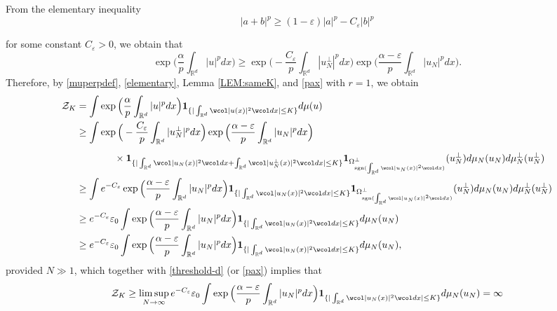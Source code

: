 \documentclass[%
11pt,  reqno]{amsart}
\theoremstyle{remarkstyle}
\newcommand{\1}{\hspace{0.2mm}\text{I}\hspace{0.2mm}}
\newcommand{\noi}{\noindent}
\newcommand{\R}{\mathbb{R}}
\newcommand{\al}{\alpha}
\newcommand{\eps}{\varepsilon}
\newcommand{\wick}[1]{\wcol#1\wcol}
\renewcommand{\O}{\Omega}
\newcommand{\ind}{\mathbf 1}
\numberwithin{equation}{section}
\numberwithin{theorem}{section}
\begin{document}
	
	From the elementary inequality 
	\[ 
	|a + b|^p \ge (1-\eps) |a|^p - C_\eps |b|^p 
	\]
	
	\noi 
	for some constant $C_\eps > 0$, we obtain that 
	\begin{equation}\label{elementary}
		\exp\Big(\frac \al p \int_{\R^d} |u|^p dx \Big) \ge \exp\Big(-\frac{C_\eps}p \int_{\R^d} |u_N^\perp|^p dx \Big) \exp\Big(\frac {\al-\eps}{p} \int_{\R^d} |u_N|^p dx \Big).
	\end{equation}
	Therefore, by \eqref{muperpdef}, \eqref{elementary}, Lemma \ref{LEM:sameK}, and \eqref{pax} with $r = 1$, we obtain 
	\begin{align*}
		\mathcal Z_K & = \int \exp\Big(\frac \al p \int_{\R^d} |u|^p dx \Big) \ind_{ \{ | \int_{\R^d} \wick{| u (x)|^2} dx | \le K\}}   d \mu(u) \\
		&\ge \int \exp\Big(-\frac {C_\eps}p \int_{\R^d} |u_N^\perp|^p dx \Big)\exp\Big(\frac {\al-\eps}{p} \int_{\R^d} |u_N|^p dx \Big) \\
		&\phantom{\int\exp\Big()} \times \ind_{ \{ | \int_{\R^d} \wick{| u_N (x)|^2} dx  + \int_{\R^d} \wick{| u_N^\perp (x)|^2} dx | \le K\}}\ind_{\O_{\mathrm{sgn}(\int_{\R^d} \wick{| u_N (x)|^2} dx)}^\perp}(u_N^\perp) d \mu_N(u_N)d \mu_N^\perp(u_N^\perp)\\
		&\ge \int e^{-C_\eps} \exp\Big(\frac {\al -\eps}{p} \int_{\R^d} |u_N|^p dx \Big) \ind_{ \{ | \int_{\R^d} \wick{| u_N (x)|^2} dx| \le  K\}}\ind_{\O_{\mathrm{sgn}(\int_{\R^d} \wick{| u_N (x)|^2} dx)}^\perp}(u_N^\perp) d \mu_N(u_N)d \mu_N^\perp(u_N^\perp) \\
		&\ge e^{-C_\eps}\eps_0 \int \exp\Big(\frac {\al -\eps}{p} \int_{\R^d} |u_N|^p dx \Big) \ind_{ \{ | \int_{\R^d} \wick{| u_N (x)|^2} dx| \le K \}}d \mu_N(u_N)\\
		& \ge e^{-C_\eps} \eps_0  \int \exp\Big(\frac {\al -\eps}{p} \int_{\R^d} |u_N|^p dx \Big) \ind_{ \{ | \int_{\R^d} \wick{| u_N (x)|^2} dx| \le K\}}d \mu_N(u_N),
	\end{align*}
	provided $N\gg 1$, which together with \eqref{threshold-d} (or \eqref{pax}) implies that 
	\[
	\mathcal Z_K \ge \limsup_{N\to \infty} 
	e^{-C_\eps} \eps_0 \int \exp\Big(\frac {\al-\eps}{p} \int_{\R^d} |u_N|^p dx \Big) \ind_{ \{ | \int_{\R^d} \wick{| u_N (x)|^2} dx| \le  K\}}d \mu_N(u_N) = \infty
	\]
	
\end{document}
